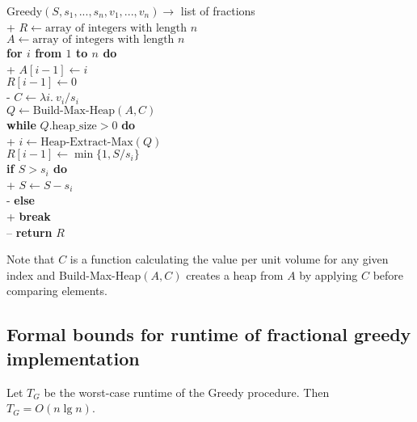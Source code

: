 \documentclass{article}
\begin{document}
\begin{pseudo}
    Greedy$(S, s_1, ..., s_n, v_1, ..., v_n)\to$ list of fractions\\+
        $R\leftarrow\text{array of integers with length }n$\\
        $A\leftarrow\text{array of integers with length }n$\\
        \textbf{for $i$ from $1$ to $n$ do}\\+
            $A[i-1] \leftarrow i$\\
            $R[i-1] \leftarrow 0$\\-
        $C\leftarrow \lambda i.\:v_i/s_i$\\
        $Q\leftarrow\text{Build-Max-Heap}(A,C)$\\
        \textbf{while} $Q.\text{heap\_size}>0$ \textbf{do}\\+
            $i\leftarrow\text{Heap-Extract-Max}(Q)$\\
            $R[i-1]\leftarrow \min\{1, S/s_i\}$\\
            \textbf{if $S>s_i$ do}\\+
                $S\leftarrow S-s_i$\\-
            \textbf{else}\\+
                \textbf{break}\\--
        \textbf{return} $R$
\end{pseudo}

Note that $C$ is a function calculating the value per unit volume
for any given index and Build-Max-Heap$(A,C)$ creates a heap from $A$
by applying $C$ before comparing elements.

\subsection{Formal bounds for runtime of fractional greedy implementation}

\begin{claim}
    Let $T_G$ be the worst-case runtime of the Greedy procedure. Then $T_G=O(n\lg n)$.
\end{claim}
\end{document}
